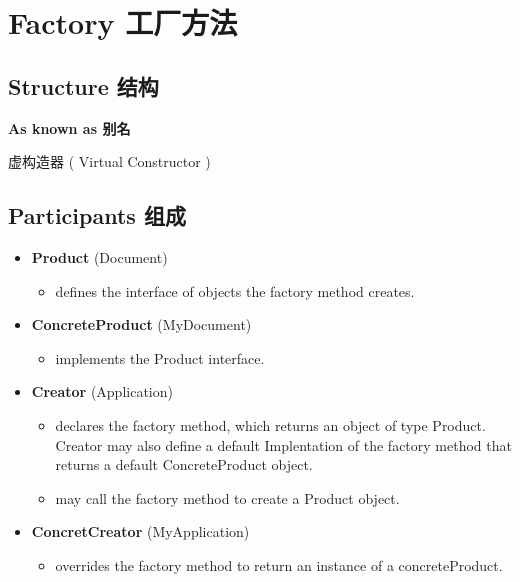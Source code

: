 \section{Factory 工厂方法}

\subsection{Structure 结构}


\textbf{ As known as 别名 }

虚构造器 ( Virtual Constructor )

\subsection{Participants 组成}

\begin{itemize}
\small

\item \textbf{Product} (Document)
	\begin{itemize}
		\item defines the interface of objects the factory method creates.
	\end{itemize}

\item \textbf{ConcreteProduct} (MyDocument)
	\begin{itemize}
		\item implements the Product interface.
	\end{itemize}

\item \textbf{Creator} (Application)
	\begin{itemize} 
		\item declares the factory method, which returns an object of type Product. Creator may also define a default Implentation of the factory method that returns a default ConcreteProduct object.

		\item may call the factory method to create a Product object.
	\end{itemize}

\item \textbf{ConcretCreator} (MyApplication)
	\begin{itemize}
		\item overrides the factory method to return an instance of a concreteProduct.
	\end{itemize}

\normalize
\end{itemize}

